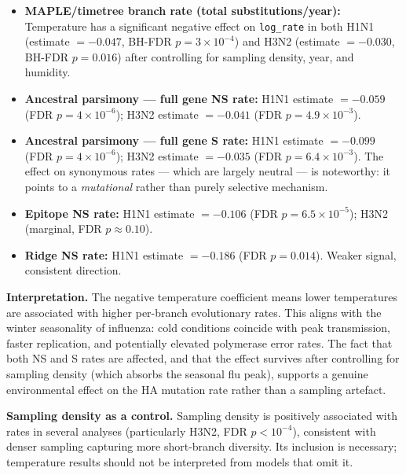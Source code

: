 \documentclass[11pt, a4paper]{article}
\begin{document}
\begin{itemize}
  \item \textbf{MAPLE/timetree branch rate (total substitutions/year):}
        Temperature has a significant negative effect on \texttt{log\_rate}
        in both H1N1 (estimate $= -0.047$, BH-FDR $p = 3 \times 10^{-4}$)
        and H3N2 (estimate $= -0.030$, BH-FDR $p = 0.016$) after controlling
        for sampling density, year, and humidity.

  \item \textbf{Ancestral parsimony — full gene NS rate:}
        H1N1 estimate $= -0.059$ (FDR $p = 4 \times 10^{-6}$);
        H3N2 estimate $= -0.041$ (FDR $p = 4.9 \times 10^{-3}$).

  \item \textbf{Ancestral parsimony — full gene S rate:}
        H1N1 estimate $= -0.099$ (FDR $p = 4 \times 10^{-6}$);
        H3N2 estimate $= -0.035$ (FDR $p = 6.4 \times 10^{-3}$).
        The effect on synonymous rates — which are largely neutral — is
        noteworthy: it points to a \textit{mutational} rather than purely
        selective mechanism.

  \item \textbf{Epitope NS rate:}
        H1N1 estimate $= -0.106$ (FDR $p = 6.5 \times 10^{-5}$);
        H3N2 (marginal, FDR $p \approx 0.10$).

  \item \textbf{Ridge NS rate:}
        H1N1 estimate $= -0.186$ (FDR $p = 0.014$). Weaker signal,
        consistent direction.
\end{itemize}

\textbf{Interpretation.}
The negative temperature coefficient means lower temperatures are associated
with higher per-branch evolutionary rates.
This aligns with the winter seasonality of influenza: cold conditions
coincide with peak transmission, faster replication, and potentially elevated
polymerase error rates.
The fact that both NS and S rates are affected, and that the effect survives
after controlling for sampling density (which absorbs the seasonal flu peak),
supports a genuine environmental effect on the HA mutation rate rather than a
sampling artefact.

\textbf{Sampling density as a control.}
Sampling density is positively associated with rates in several analyses
(particularly H3N2, FDR $p < 10^{-4}$), consistent with denser sampling
capturing more short-branch diversity. Its inclusion is necessary; temperature
results should not be interpreted from models that omit it.
\end{document}
